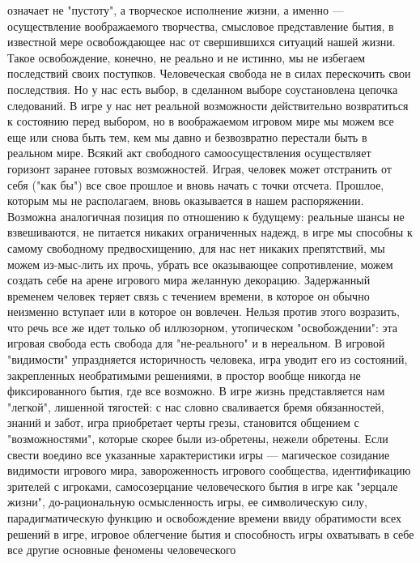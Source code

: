 \documentclass[12pt]{article}
\begin{document}
означает не "пустоту", а творческое исполнение жизни, а именно --- осуществление воображаемого творчества,
смысловое представление бытия, в известной мере освобождающее нас от свершившихся ситуаций нашей
жизни. Такое освобождение, конечно, не реально и не истинно, мы не избегаем последствий своих поступков.
Человеческая свобода не в силах перескочить свои последствия. Но у нас есть выбор, в сделанном выборе
соустановлена цепочка следований. В игре у нас нет реальной возможности действительно возвратиться к
состоянию перед выбором, но в воображаемом игровом мире мы можем все еще или снова быть тем, кем мы
давно  и  безвозвратно  перестали  быть  в  реальном  мире.  Всякий  акт  свободного  самоосуществления
осуществляет горизонт заранее готовых возможностей. Играя, человек может отстранить от себя ("как бы") все
свое прошлое и вновь начать с точки отсчета. Прошлое, которым мы не располагаем, вновь оказывается в 
нашем  распоряжении.  Возможна  аналогичная  позиция  по  отношению  к  будущему:  реальные  шансы  не
взвешиваются,  не  питается  никаких  ограниченных  надежд,  в  игре  мы  способны  к  самому  свободному
предвосхищению, для нас нет никаких препятствий, мы можем из-мыс-лить их прочь, убрать все оказывающее
сопротивление, можем создать себе на арене игрового мира желанную декорацию. Задержанный временем
человек теряет связь с течением времени, в которое он обычно неизменно вступает или в которое он вовлечен.
Нельзя против этого возразить, что речь все же идет только об иллюзорном, утопическом "освобождении": эта
игровая  свобода  есть  свобода  для  "не-реального"  и  в  нереальном.  В  игровой  "видимости"  упраздняется
историчность человека, игра уводит его из состояний, закрепленных необратимыми решениями, в простор
вообще никогда не  фиксированного бытия, где  все возможно. В игре жизнь представляется нам "легкой",
лишенной тягостей: с нас словно сваливается бремя обязанностей, знаний и забот, игра приобретает черты
грезы, становится общением с "возможностями", которые скорее были из-обретены, нежели обретены. Если
свести  воедино  все  указанные  характеристики  игры  ---  магическое  созидание  видимости  игрового  мира,
завороженность  игрового сообщества,  идентификацию  зрителей  с игроками,  самосозерцание человеческого
бытия  в  игре  как  "зерцале  жизни",  до-рациональную  осмысленность  игры,  ее  символическую  силу,
парадигматическую  функцию  и  освобождение  времени  ввиду  обратимости  всех  решений  в  игре,  игровое
облегчение  бытия  и  способность  игры  охватывать  в  себе  все  другие  основные  феномены  человеческого
\end{document}
